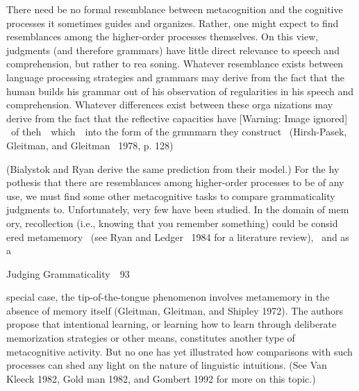 \begin{styleStandard}
There need be no formal resemblance between metacognition and the cognitive processes it sometimes guides and organizes. Rather, one might expect to find resemblances among the higher-order processes themselves. On this view, judgments (and therefore grammars) have little direct relevance to speech and comprehension, but rather to rea\- soning. Whatever resemblance exists between language processing strategies and grammars may derive from the fact that the human builds his grammar out of his observation of regularities in his speech and comprehension. Whatever differences exist between these orga\- nizations may derive from the fact that the reflective capacities have   [Warning: Image ignored] %
  \ of theh\ \ which\ \ into the form of the grmnmarn they construct \ (Hirsh-Pasek, Gleitman, and Gleitman \ 1978, p. 128)
\end{styleStandard}


\begin{styleStandard}
(Bialystok and Ryan derive the same prediction from their model.) For the hy\- pothesis that there are resemblances among higher-order processes to be of any use, we must find some other metacognitive tasks to compare grammaticality judgments to. Unfortunately, very few have been studied. In the domain of mem\- ory, recollection (i.e., knowing that you remember something) could be consid\- ered metamemory \ (see Ryan and Ledger \ 1984 for a literature review), \ and as a
\end{styleStandard}


\clearpage\setcounter{page}{1}\begin{styleStandard}
Judging Grammaticality\ \ 93
\end{styleStandard}


\begin{styleTextbody}
special case, the tip-of-the-tongue phenomenon involves metamemory in the absence of memory itself (Gleitman, Gleitman, and Shipley 1972). The authors propose that intentional learning, or learning how to learn through deliberate memorization strategies or other means, constitutes another type of metacognitive activity. But no one has yet illustrated how comparisons with such processes can shed any light on the nature of linguistic intuitions. (See Van Kleeck 1982, Gold\- man 1982, and Gombert 1992 for more on this topic.)
\end{styleTextbody}


